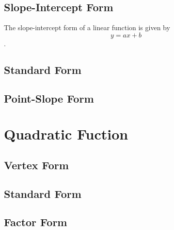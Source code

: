 \documentclass[11pt]{article}
\begin{document}
	\subsection{Slope-Intercept Form}
	The slope-intercept form of a linear function is given by $$y=ax+b$$.
	\subsection{Standard Form}
	\subsection{Point-Slope Form}
\section{Quadratic Fuction}
	\subsection{Vertex Form}
	\subsection{Standard Form}
	\subsection{Factor Form}
\end{document}
